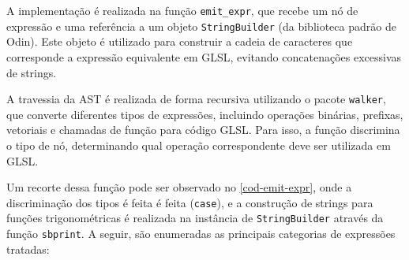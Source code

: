 A implementação é realizada na função \verb"emit_expr", que recebe um nó de expressão e uma referência a um objeto \verb"StringBuilder" (da biblioteca padrão de Odin). Este objeto é utilizado para construir a cadeia de caracteres que corresponde a expressão equivalente em GLSL, evitando concatenações excessivas de strings.

A travessia da AST é realizada de forma recursiva utilizando o pacote \texttt{walker}, que converte diferentes tipos de expressões, incluindo operações binárias, prefixas, vetoriais e chamadas de função para código GLSL. Para isso, a função discrimina o tipo de nó, determinando qual operação correspondente deve ser utilizada em GLSL. 

Um recorte dessa função pode ser observado no \autoref{cod-emit-expr}, onde a discriminação dos tipos é feita é feita (\texttt{case}), e a construção de strings para funções trigonométricas é realizada na instância de \texttt{StringBuilder} através da função \verb|sbprint|. A seguir, são enumeradas as principais categorias de expressões tratadas:

